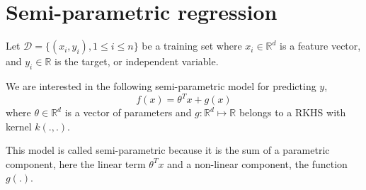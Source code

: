 \documentclass{article}[12pt]
\begin{document}
\section{Semi-parametric regression}
Let $\mathcal{D}=\{(x_i,y_i), 1 \leq i \leq n\}$ be a training set where $x_i \in \mathbb{R}^d$ is a feature vector, and $y_i \in \mathbb{R}$ is the target, or independent variable. 

We are interested in the following semi-parametric model for predicting $y$, 
\begin{equation}
f(x) = \theta^T x + g(x)
\end{equation}
where $\theta \in \mathbb{R}^d$ is a vector of parameters and $g: \mathbb{R}^d \mapsto \mathbb{R}$ belongs to a RKHS with kernel $k(.,.)$. 

This model is called semi-parametric because it is the sum of a parametric component, here the linear term $\theta^T x$ and a non-linear component, the function $g(.)$. 
\end{document}
